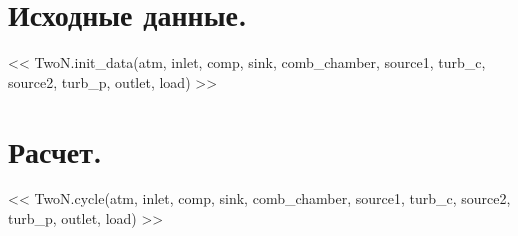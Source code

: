 \documentclass[a4paper,10pt]{article}
\begin{document}
    \section{Исходные данные.}

    << TwoN.init_data(atm, inlet, comp, sink, comb_chamber, source1, turb_c, source2, turb_p, outlet, load) >>

    \section{Расчет.}

    << TwoN.cycle(atm, inlet, comp, sink, comb_chamber, source1, turb_c, source2, turb_p, outlet, load) >>
\end{document}
